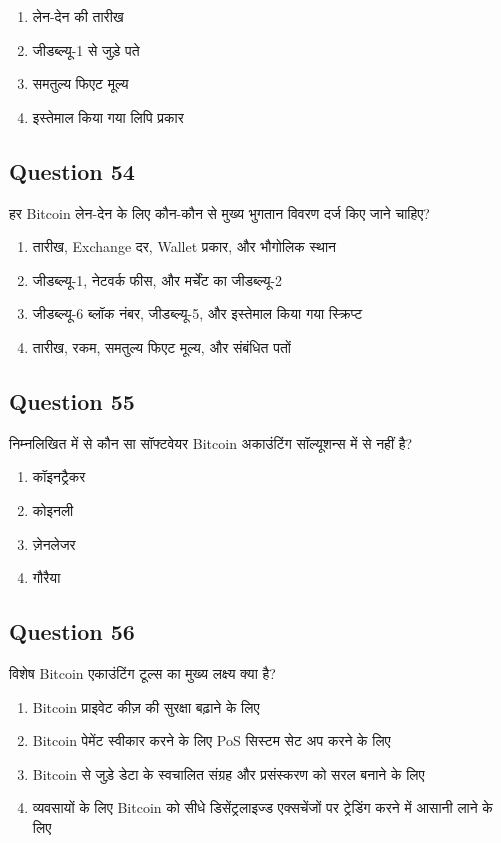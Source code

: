 \documentclass[12pt,a4paper]{article}
\begin{document}
\begin{enumerate}[label=\Alph*., leftmargin=*]
\item लेन-देन की तारीख
\item जीडब्ल्यू-1 से जुड़े पते
\item समतुल्य फिएट मूल्य
\item इस्तेमाल किया गया लिपि प्रकार
\end{enumerate}

\bigskip


\subsection*{Question 54}
हर Bitcoin लेन-देन के लिए कौन-कौन से मुख्य भुगतान विवरण दर्ज किए जाने चाहिए?

\begin{enumerate}[label=\Alph*., leftmargin=*]
\item तारीख, Exchange दर, Wallet प्रकार, और भौगोलिक स्थान
\item जीडब्ल्यू-1, नेटवर्क फीस, और मर्चेंट का जीडब्ल्यू-2
\item जीडब्ल्यू-6 ब्लॉक नंबर, जीडब्ल्यू-5, और इस्तेमाल किया गया स्क्रिप्ट
\item तारीख, रकम, समतुल्य फिएट मूल्य, और संबंधित पतों
\end{enumerate}

\bigskip


\subsection*{Question 55}
निम्नलिखित में से कौन सा सॉफ्टवेयर Bitcoin अकाउंटिंग सॉल्यूशन्स में से नहीं है?

\begin{enumerate}[label=\Alph*., leftmargin=*]
\item कॉइनट्रैकर
\item कोइनली
\item ज़ेनलेजर
\item गौरैया
\end{enumerate}

\bigskip


\subsection*{Question 56}
विशेष Bitcoin एकाउंटिंग टूल्स का मुख्य लक्ष्य क्या है?

\begin{enumerate}[label=\Alph*., leftmargin=*]
\item Bitcoin प्राइवेट कीज़ की सुरक्षा बढ़ाने के लिए
\item Bitcoin पेमेंट स्वीकार करने के लिए PoS सिस्टम सेट अप करने के लिए
\item Bitcoin से जुड़े डेटा के स्वचालित संग्रह और प्रसंस्करण को सरल बनाने के लिए
\item व्यवसायों के लिए Bitcoin को सीधे डिसेंट्रलाइज्ड एक्सचेंजों पर ट्रेडिंग करने में आसानी लाने के लिए
\end{enumerate}
\end{document}
